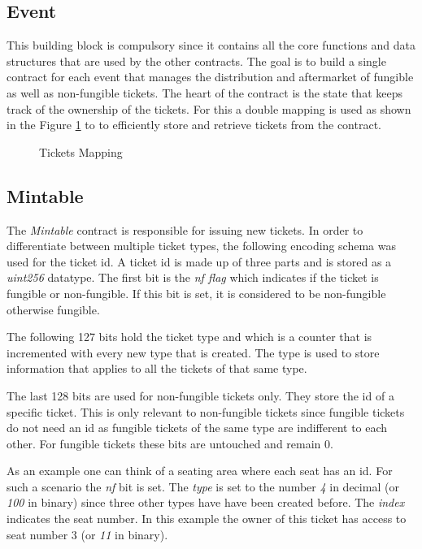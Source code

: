 \subsection{Event}
This building block is compulsory since it contains all the core functions and data structures that are used by the other contracts. The goal is to build a single contract for each event that manages the distribution and aftermarket of fungible as well as non-fungible tickets. The heart of the contract is the state that keeps track of the ownership of the tickets. For this a double mapping is used as shown in the Figure \ref{code:tickets} to to efficiently store and retrieve tickets from the contract.

\begin{figure}[H]
    
    \caption{Tickets Mapping}
    \label{code:tickets}
\end{figure}


\subsection{Mintable}\label{sec:tickets}
The \textit{Mintable} contract is responsible for issuing new tickets. In order to differentiate between multiple ticket types, the following encoding schema was used for the ticket id. A ticket id is made up of three parts and is stored as a \textit{uint256} datatype. The first bit is the \textit{nf flag} which indicates if the ticket is fungible or non-fungible. If this bit is set, it is considered to be non-fungible otherwise fungible. 

The following 127 bits hold the ticket type and which is a counter that is incremented with every new type that is created. The type is used to store information that applies to all the tickets of that same type. 

The last 128 bits are used for non-fungible tickets only. They store the id of a specific ticket. This is only relevant to non-fungible tickets since fungible tickets do not need an id as fungible tickets of the same type are indifferent to each other. For fungible tickets these bits are untouched and remain 0.

As an example one can think of a seating area where each seat has an id. For such a scenario the \textit{nf} bit is set. The \textit{type} is set to the number \textit{4} in decimal (or \textit{100} in binary) since three other types have have been created before. The \textit{index} indicates the seat number. In this example the owner of this ticket has access to seat number 3 (or \textit{11} in binary).


